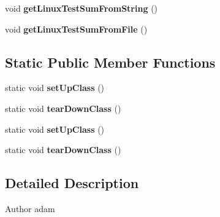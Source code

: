 \begin{DoxyCompactItemize}
\item 
\hypertarget{class_c_a_s_u_a_l_1_1crypto_1_1_s_h_a256sum_test_a5251d3dc892ae7ccf10bdc31cfe988bc}{void {\bfseries get\-Linux\-Test\-Sum\-From\-String} ()}\label{class_c_a_s_u_a_l_1_1crypto_1_1_s_h_a256sum_test_a5251d3dc892ae7ccf10bdc31cfe988bc}

\item 
\hypertarget{class_c_a_s_u_a_l_1_1crypto_1_1_s_h_a256sum_test_a5a7da46a949a3cd9b21d93ae2f4401a4}{void {\bfseries get\-Linux\-Test\-Sum\-From\-File} ()}\label{class_c_a_s_u_a_l_1_1crypto_1_1_s_h_a256sum_test_a5a7da46a949a3cd9b21d93ae2f4401a4}

\end{DoxyCompactItemize}
\subsection*{Static Public Member Functions}
\begin{DoxyCompactItemize}
\item 
\hypertarget{class_c_a_s_u_a_l_1_1crypto_1_1_s_h_a256sum_test_a06a1d0f62fa9ada30ee9a8cd4bcfb4cc}{static void {\bfseries set\-Up\-Class} ()}\label{class_c_a_s_u_a_l_1_1crypto_1_1_s_h_a256sum_test_a06a1d0f62fa9ada30ee9a8cd4bcfb4cc}

\item 
\hypertarget{class_c_a_s_u_a_l_1_1crypto_1_1_s_h_a256sum_test_a8a5c2572e4645b39464d7536437ce51f}{static void {\bfseries tear\-Down\-Class} ()}\label{class_c_a_s_u_a_l_1_1crypto_1_1_s_h_a256sum_test_a8a5c2572e4645b39464d7536437ce51f}

\item 
\hypertarget{class_c_a_s_u_a_l_1_1crypto_1_1_s_h_a256sum_test_a06a1d0f62fa9ada30ee9a8cd4bcfb4cc}{static void {\bfseries set\-Up\-Class} ()}\label{class_c_a_s_u_a_l_1_1crypto_1_1_s_h_a256sum_test_a06a1d0f62fa9ada30ee9a8cd4bcfb4cc}

\item 
\hypertarget{class_c_a_s_u_a_l_1_1crypto_1_1_s_h_a256sum_test_a8a5c2572e4645b39464d7536437ce51f}{static void {\bfseries tear\-Down\-Class} ()}\label{class_c_a_s_u_a_l_1_1crypto_1_1_s_h_a256sum_test_a8a5c2572e4645b39464d7536437ce51f}

\end{DoxyCompactItemize}


\subsection{Detailed Description}
\begin{DoxyAuthor}{Author}
adam 
\end{DoxyAuthor}


